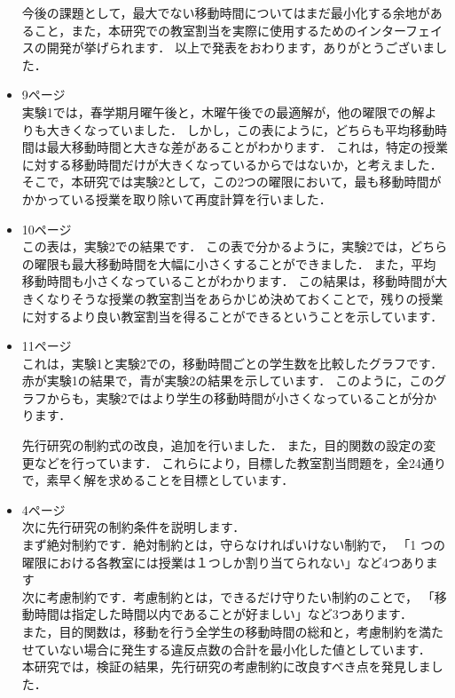 \documentclass{jsarticle}
\begin{document}
\begin{itemize}
今後の課題として，最大でない移動時間についてはまだ最小化する余地があること，また，本研究での教室割当を実際に使用するためのインターフェイスの開発が挙げられます．
以上で発表をおわります，ありがとうございました．




\item 9ページ\\
実験1では，春学期月曜午後と，木曜午後での最適解が，他の曜限での解よりも大きくなっていました．
しかし，この表にように，どちらも平均移動時間は最大移動時間と大きな差があることがわかります．
これは，特定の授業に対する移動時間だけが大きくなっているからではないか，と考えました．
そこで，本研究では実験2として，この2つの曜限において，最も移動時間がかかっている授業を取り除いて再度計算を行いました．

\item 10ページ\\
この表は，実験2での結果です．
この表で分かるように，実験2では，どちらの曜限も最大移動時間を大幅に小さくすることができました．
また，平均移動時間も小さくなっていることがわかります．
この結果は，移動時間が大きくなりそうな授業の教室割当をあらかじめ決めておくことで，残りの授業に対するより良い教室割当を得ることができるということを示しています．

\item 11ページ\\
これは，実験1と実験2での，移動時間ごとの学生数を比較したグラフです．
赤が実験1の結果で，青が実験2の結果を示しています．
このように，このグラフからも，実験2ではより学生の移動時間が小さくなっていることが分かります．

\fi


先行研究の制約式の改良，追加を行いました．
また，目的関数の設定の変更などを行っています．
これらにより，目標した教室割当問題を，全24通りで，素早く解を求めることを目標としています．

\item 4ページ\\
次に先行研究の制約条件を説明します．\\
まず絶対制約です．絶対制約とは，守らなければいけない制約で，
「1 つの曜限における各教室には授業は１つしか割り当てられない」など4つあります\\
次に考慮制約です．考慮制約とは，できるだけ守りたい制約のことで，
「移動時間は指定した時間以内であることが好ましい」など3つあります．\\
また，目的関数は，移動を行う全学生の移動時間の総和と，考慮制約を満たせていない場合に発生する違反点数の合計を最小化した値としています．\\
本研究では，検証の結果，先行研究の考慮制約に改良すべき点を発見しました．




\end{itemize}
\end{document}
